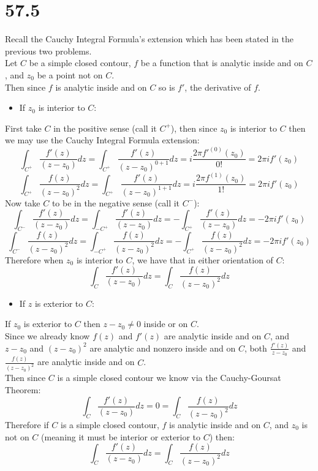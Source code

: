 \documentclass{article}
\begin{document}
\newpage
\section*{57.5}
\begin{center}
    \doublespacing
    Recall the Cauchy Integral Formula's extension which has been stated in the previous two problems.
    \\Let $C$ be a simple closed contour, $f$ be a function that is analytic inside and on $C$, and $z_0$ be a point not on $C$.
    \\Then since $f$ is analytic inside and on $C$ so is $f'$, the derivative of $f$.
\end{center}
\begin{itemize}
    \item If $z_0$ is interior to $C$:
\end{itemize}
\begin{center}
    \doublespacing
    First take $C$ in the positive sense (call it $C^+$), then since $z_0$ is interior to $C$ then we may use the Cauchy Integral Formula extension:
    \[\int _{C^+}\frac{f'(z)}{(z - z_0)} dz =\int _{C^+}\frac{f'(z)}{(z - z_0)^{0 + 1}} dz = i\frac{2\pi f'^{(0)} (z_0)}{0!} = 2\pi i f'(z_0)\]
    \[\int _{C^+}\frac{f(z)}{(z - z_0)^2} dz =\int _{C^+}\frac{f'(z)}{(z - z_0)^{1 + 1}} dz = i\frac{2\pi f^{(1)} (z_0)}{1!} = 2\pi i f'(z_0)\]
    Now take $C$ to be in the negative sense (call it $C^-$):
    \[\int _{C^-}\frac{f'(z)}{(z - z_0)} dz =\int _{-C^+}\frac{f'(z)}{(z - z_0)} dz = -\int _{C^+}\frac{f'(z)}{(z - z_0)} dz = -2\pi i f'(z_0)\]
    \[\int _{C^-}\frac{f(z)}{(z - z_0)^2} dz =\int _{-C^+}\frac{f(z)}{(z - z_0)^2} dz = -\int _{C^+}\frac{f(z)}{(z - z_0)^2} dz = -2\pi i f'(z_0)\]
    Therefore when $z_0$ is interior to $C$, we have that in either orientation of $C$:
    \[\int _C\frac{f'(z)}{(z - z_0)} dz =\int _C\frac{f(z)}{(z - z_0)^2} dz\]
\end{center}
\begin{itemize}
    \item If $z$ is exterior to $C$:
\end{itemize}
\begin{center}
    \doublespacing
    If $z_0$ is exterior to $C$ then $z - z_0\neq 0$ inside or on $C$.
    \\Since we already know $f(z)$ and $f'(z)$ are analytic inside and on $C$, and $z - z_0$ and $(z - z_0)^2$ are analytic and nonzero inside and on $C$, both $\frac{f'(z)}{z - z_0}$ and $\frac{f(z)}{(z - z_0)^2}$ are analytic inside and on $C$.
    \\Then since $C$ is a simple closed contour we know via the Cauchy-Goursat Theorem:
    \[\int _C\frac{f'(z)}{(z - z_0)} dz = 0 =\int _C\frac{f(z)}{(z - z_0)^2} dz\]
    \break
    Therefore if $C$ is a simple closed contour, $f$ is analytic inside and on $C$, and $z_0$ is not on $C$ (meaning it must be interior or exterior to $C$) then:
    \[\int _C\frac{f'(z)}{(z - z_0)} dz =\int _C\frac{f(z)}{(z - z_0)^2} dz\]
    \qedsymbol
\end{center}
\end{document}
